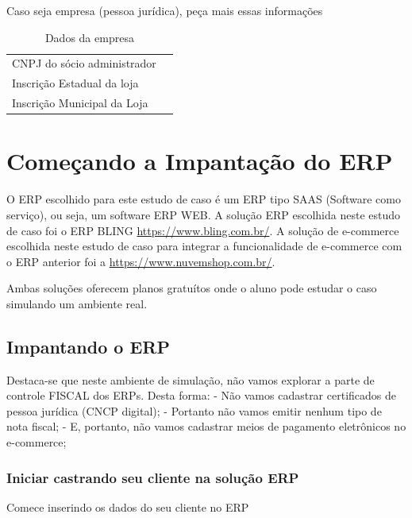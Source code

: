 \documentclass[
]{book}
\begin{document}
Caso seja empresa (pessoa jurídica), peça mais essas informações

\begin{longtable}[]{@{}ll@{}}
\caption{Dados da empresa}\tabularnewline
\toprule\noalign{}
\endfirsthead
\endhead
\bottomrule\noalign{}
\endlastfoot
CNPJ do sócio administrador & \\
Inscrição Estadual da loja & \\
Inscrição Municipal da Loja & \\
\end{longtable}

\section{Começando a Impantação do ERP}\label{comeuxe7ando-a-impantauxe7uxe3o-do-erp}

O ERP escolhido para este estudo de caso é um ERP tipo SAAS (Software como serviço), ou seja, um software ERP WEB.
A solução ERP escolhida neste estudo de caso foi o ERP BLING \url{https://www.bling.com.br/}.
A solução de e-commerce escolhida neste estudo de caso para integrar a funcionalidade de e-commerce com o ERP anterior foi a \url{https://www.nuvemshop.com.br/}.

Ambas soluções oferecem planos gratuítos onde o aluno pode estudar o caso simulando um ambiente real.

\subsection{Impantando o ERP}\label{impantando-o-erp}

Destaca-se que neste ambiente de simulação, não vamos explorar a parte de controle FISCAL dos ERPs.
Desta forma:
- Não vamos cadastrar certificados de pessoa jurídica (CNCP digital);
- Portanto não vamos emitir nenhum tipo de nota fiscal;
- E, portanto, não vamos cadastrar meios de pagamento eletrônicos no e-commerce;

\subsubsection{Iniciar castrando seu cliente na solução ERP}\label{iniciar-castrando-seu-cliente-na-soluuxe7uxe3o-erp}

Comece inserindo os dados do seu cliente no ERP
\end{document}
